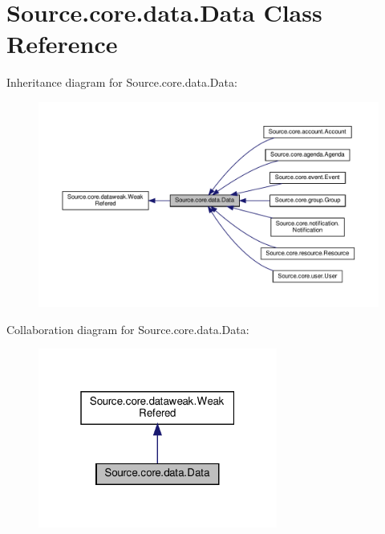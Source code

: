 \hypertarget{classSource_1_1core_1_1data_1_1Data}{}\section{Source.\+core.\+data.\+Data Class Reference}
\label{classSource_1_1core_1_1data_1_1Data}


Inheritance diagram for Source.\+core.\+data.\+Data\+:\nopagebreak
\begin{figure}[H]
\begin{center}
\leavevmode
\includegraphics[width=350pt]{classSource_1_1core_1_1data_1_1Data__inherit__graph}
\end{center}
\end{figure}


Collaboration diagram for Source.\+core.\+data.\+Data\+:\nopagebreak
\begin{figure}[H]
\begin{center}
\leavevmode
\includegraphics[width=223pt]{classSource_1_1core_1_1data_1_1Data__coll__graph}
\end{center}
\end{figure}

